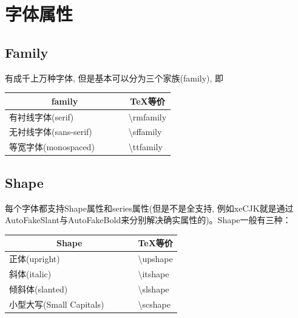 \section{字体属性}
\subsection{Family}

有成千上万种字体, 但是基本可以分为三个家族(family), 即

\begin{table}[h]
    \centering
    \begin{tabular}{@{}ll@{}}
    \toprule
    \multicolumn{1}{c}{\textbf{family}} & \multicolumn{1}{c}{\textbf{TeX等价}} \\ \midrule
    有衬线字体(serif)                        & \textbackslash{}rmfamily           \\
    无衬线字体(sans-serif)                   & \textbackslash{}sffamily           \\
    等宽字体(monospaced)~~~~~~           & \textbackslash{}ttfamily           \\ \bottomrule
    \end{tabular}
\end{table}

\subsection{Shape}

每个字体都支持Shape属性和series属性(但是不是全支持, 例如xeCJK就是通过AutoFakeSlant与AutoFakeBold来分别解决确实属性的)。Shape一般有三种：

\begin{table}[h]
    \centering
    \begin{tabular}{@{}ll@{}}
    \toprule
    \multicolumn{1}{c}{\textbf{Shape}} & \multicolumn{1}{c}{\textbf{TeX等价}} \\ \midrule
    正体(upright)                       & \textbackslash{}upshape          \\
    斜体(italic)                  & \textbackslash{}itshape           \\
    倾斜体(slanted)          & \textbackslash{}slshape        \\
    小型大写(Small Capitals)~~~~~~           & \textbackslash{}scshape      \\ \bottomrule
    \end{tabular}
\end{table}

